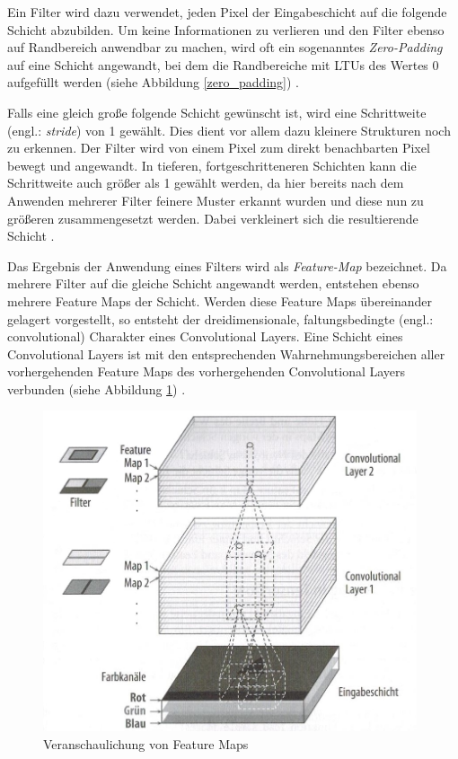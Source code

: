 Ein Filter wird dazu verwendet, jeden Pixel der Eingabeschicht auf die folgende Schicht abzubilden. Um keine Informationen zu verlieren und den Filter ebenso auf Randbereich anwendbar zu machen, wird oft ein sogenanntes \textit{Zero-Padding} auf eine Schicht angewandt, bei dem die Randbereiche mit LTUs des Wertes 0 aufgefüllt werden (siehe Abbildung \ref{zero_padding}) \cite{AurelienGeron.2018}.

Falls eine gleich große folgende Schicht gewünscht ist, wird eine Schrittweite (engl.: \textit{stride}) von 1 gewählt. Dies dient vor allem dazu kleinere Strukturen noch zu erkennen. Der Filter wird von einem Pixel zum direkt benachbarten Pixel bewegt und angewandt. In tieferen, fortgeschritteneren Schichten kann die Schrittweite auch größer als 1 gewählt werden, da hier bereits nach dem Anwenden mehrerer Filter feinere Muster erkannt wurden und diese nun zu größeren zusammengesetzt werden. Dabei verkleinert sich die resultierende Schicht \cite{AurelienGeron.2018}.

Das Ergebnis der Anwendung eines Filters wird als \textit{Feature-Map} bezeichnet. Da mehrere Filter auf die gleiche Schicht angewandt werden, entstehen ebenso mehrere Feature Maps der Schicht. Werden diese Feature Maps übereinander gelagert vorgestellt, so entsteht der dreidimensionale, \glqq faltungsbedingte\grqq{} (engl.: convolutional) Charakter eines Convolutional Layers. Eine Schicht eines Convolutional Layers ist mit den entsprechenden Wahrnehmungsbereichen aller vorhergehenden Feature Maps des vorhergehenden Convolutional Layers verbunden (siehe Abbildung \ref{feature_maps}) \cite{AurelienGeron.2018}.

\begin{figure}[H]
	\begin{center}
		\includegraphics[width=11cm]{Bilder/feature_maps.jpeg} 
		\caption[Veranschaulichung von Feature Maps]{Veranschaulichung von Feature Maps \cite{AurelienGeron.2018}}
		\label{feature_maps}
	\end{center}
\end{figure}

